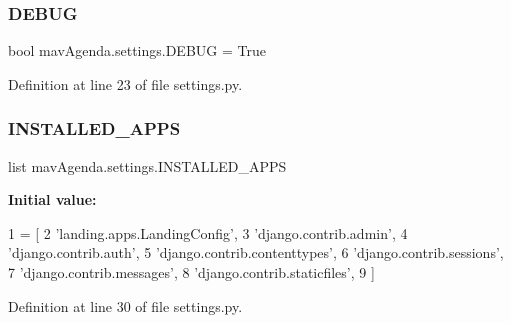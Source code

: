 \mbox{\label{namespacemavAgenda_1_1settings_aaa092728fcb45002a379980f9bf58b0b}} 
\subsubsection{\texorpdfstring{D\+E\+B\+UG}{DEBUG}}
{\footnotesize\ttfamily bool mav\+Agenda.\+settings.\+D\+E\+B\+UG = True}



Definition at line 23 of file settings.\+py.

\mbox{\label{namespacemavAgenda_1_1settings_a8dd26f1a92700761e22c785c57781d4c}} 
\subsubsection{\texorpdfstring{I\+N\+S\+T\+A\+L\+L\+E\+D\+\_\+\+A\+P\+PS}{INSTALLED\_APPS}}
{\footnotesize\ttfamily list mav\+Agenda.\+settings.\+I\+N\+S\+T\+A\+L\+L\+E\+D\+\_\+\+A\+P\+PS}

{\bfseries Initial value\+:}
\begin{DoxyCode}
1 =  [
2     \textcolor{stringliteral}{'landing.apps.LandingConfig'},
3     \textcolor{stringliteral}{'django.contrib.admin'},
4     \textcolor{stringliteral}{'django.contrib.auth'},
5     \textcolor{stringliteral}{'django.contrib.contenttypes'},
6     \textcolor{stringliteral}{'django.contrib.sessions'},
7     \textcolor{stringliteral}{'django.contrib.messages'},
8     \textcolor{stringliteral}{'django.contrib.staticfiles'},
9 ]
\end{DoxyCode}


Definition at line 30 of file settings.\+py.

\mbox{\label{namespacemavAgenda_1_1settings_ab80769734fc5d1e7b02e6e7796463770}} 
